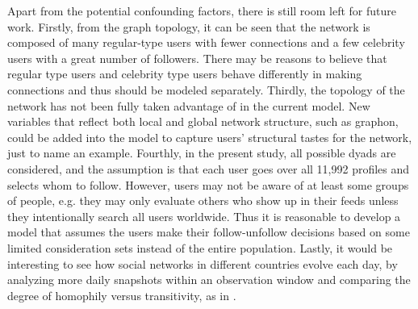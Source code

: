 Apart from the potential confounding factors, there is still room left for future work. Firstly, from the graph topology, it can be seen that the network is composed of many regular-type users with fewer connections and a few celebrity users with a great number of followers. There may be reasons to believe that regular type users and celebrity type users behave differently in making connections and thus should be modeled separately. Thirdly, the topology of the network has not been fully taken advantage of in the current model. New variables that reflect both local and global network structure, such as graphon, could be added into the model to capture users’ structural tastes for the network, just to name an example. Fourthly, in the present study, all possible dyads are considered, and the assumption is that each user goes over all 11,992 profiles and selects whom to follow. However, users may not be aware of at least some groups of people, e.g. they may only evaluate others who show up in their feeds unless they intentionally search all users worldwide. Thus it is reasonable to develop a model that assumes the users make their follow-unfollow decisions based on some limited consideration sets instead of the entire population. Lastly, it would be interesting to see how social networks in different countries evolve each day, by analyzing more daily snapshots within an observation window and comparing the degree of homophily versus transitivity, as in \cite{graham2016homophily}.

\newpage
  
  



